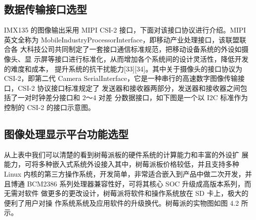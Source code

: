 \subsection{数据传输接口选型}
IMX135 的图像输出采用 MIPI CSI-2 接口，下面对该接口协议进行介绍。MIPI 英文全称为 MobileIndustryProcessorInterface，即移动产业处理接口，该联盟联合各 大科技公司共同制定了一套接口通信标准规范，把移动设备系统的外设如摄像头、显 示屏等接口进行标准化，从而增加各个系统间的设计灵活性，降低开发的难度和成本， 提升系统的抗干扰能力[33][34]。其中关于摄像头的接口协议为 CSI-2，即第二代 Camera SerialInterface，它是一种串行的高速数字图像传输接口，CSI-2 协议接口标准规定了 发送器和接收器两部分，发送器和接收器之间包括了一对时钟差分接口和 2～4 对差 分数据接口，如下图是一个以 I2C 标准作为控制的 CSI-2 的接口示意图。

\subsection{图像处理显示平台功能选型}

从上表中我们可以清楚的看到树莓派板的硬件系统的计算能力和丰富的外设扩 展能力，可将多种嵌入式系统外设接入其中，树莓派板价格较低，并且支持多种 Linux 内核的第三方操作系统，开发简单，非常适合嵌入到产品中做二次开发，并且博通 BCM2386 系列处理器兼容性好，可将其核心 SOC 升级成高版本系列，而无需对软件 做更多的更改设计，树莓派将软件和操作系统放在 SD 卡上，极大的便利了用户对操 作系统系统及应用软件的升级换代。树莓派的实物图如图 4.2 所示。
